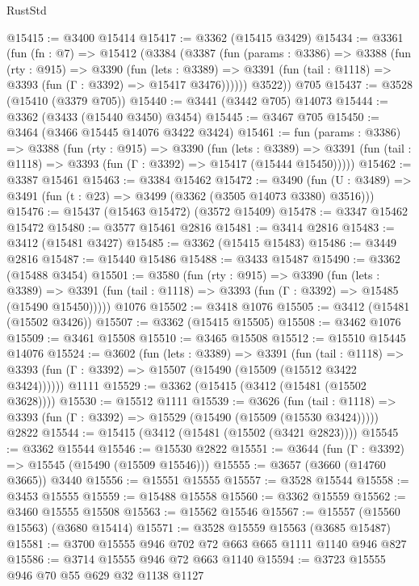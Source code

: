 \begin{lexlean}{RustStd}
\begin{coremodule}
@15415 := @3400 @15414
@15417 := @3362 (@15415 @3429)
@15434 := @3361
    (fun (fn : @7) =>
    @15412
      (@3384
        (@3387
          (fun (params : @3386) =>
          @3388
            (fun (rty : @915) =>
            @3390
              (fun (lets : @3389) =>
              @3391 (fun (tail : @1118) => @3393 (fun (Γ : @3392) => @15417 @3476))))))
        @3522))
    @705
@15437 := @3528 (@15410 (@3379 @705))
@15440 := @3441 (@3442 @705) @14073
@15444 := @3362 (@3433 (@15440 @3450) @3454)
@15445 := @3467 @705
@15450 := @3464 (@3466 @15445 @14076 @3422 @3424)
@15461 := fun (params : @3386) =>
  @3388
    (fun (rty : @915) =>
    @3390
      (fun (lets : @3389) =>
      @3391 (fun (tail : @1118) => @3393 (fun (Γ : @3392) => @15417 (@15444 @15450)))))
@15462 := @3387 @15461
@15463 := @3384 @15462
@15472 := @3490
    (fun (U : @3489) => @3491 (fun (t : @23) => @3499 (@3362 (@3505 @14073 @3380) @3516)))
@15476 := @15437 (@15463 @15472) (@3572 @15409)
@15478 := @3347 @15462 @15472
@15480 := @3577 @15461 @2816
@15481 := @3414 @2816
@15483 := @3412 (@15481 @3427)
@15485 := @3362 (@15415 @15483)
@15486 := @3449 @2816
@15487 := @15440 @15486
@15488 := @3433 @15487
@15490 := @3362 (@15488 @3454)
@15501 := @3580
    (fun (rty : @915) =>
    @3390
      (fun (lets : @3389) =>
      @3391 (fun (tail : @1118) => @3393 (fun (Γ : @3392) => @15485 (@15490 @15450)))))
    @1076
@15502 := @3418 @1076
@15505 := @3412 (@15481 (@15502 @3426))
@15507 := @3362 (@15415 @15505)
@15508 := @3462 @1076
@15509 := @3461 @15508
@15510 := @3465 @15508
@15512 := @15510 @15445 @14076
@15524 := @3602
    (fun (lets : @3389) =>
    @3391
      (fun (tail : @1118) =>
      @3393 (fun (Γ : @3392) => @15507 (@15490 (@15509 (@15512 @3422 @3424))))))
    @1111
@15529 := @3362 (@15415 (@3412 (@15481 (@15502 @3628))))
@15530 := @15512 @1111
@15539 := @3626
    (fun (tail : @1118) => @3393 (fun (Γ : @3392) => @15529 (@15490 (@15509 (@15530 @3424)))))
    @2822
@15544 := @15415 (@3412 (@15481 (@15502 (@3421 @2823))))
@15545 := @3362 @15544
@15546 := @15530 @2822
@15551 := @3644 (fun (Γ : @3392) => @15545 (@15490 (@15509 @15546)))
@15555 := @3657 (@3660 (@14760 @3665)) @3440
@15556 := @15551 @15555
@15557 := @3528 @15544
@15558 := @3453 @15555
@15559 := @15488 @15558
@15560 := @3362 @15559
@15562 := @3460 @15555 @15508
@15563 := @15562 @15546
@15567 := @15557 (@15560 @15563) (@3680 @15414)
@15571 := @3528 @15559 @15563 (@3685 @15487)
@15581 := @3700 @15555 @946 @702 @72 @663 @665 @1111 @1140 @946 @827
@15586 := @3714 @15555 @946 @72 @663 @1140
@15594 := @3723 @15555 @946 @70 @55 @629 @32 @1138 @1127

\end{coremodule}
\end{lexlean}
